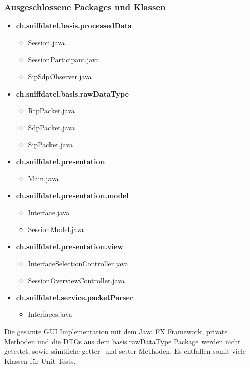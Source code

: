 \documentclass[a4,12pt]{scrartcl}
\begin{document}
\subsubsection{Ausgeschlossene Packages und Klassen}
\begin{itemize}
\item \textbf{ch.sniffdatel.basis.processedData}
\begin{itemize}
\item Session.java
\item SessionParticipant.java
\item SipSdpObserver.java
\end{itemize}
\item \textbf{ch.sniffdatel.basis.rawDataType}
\begin{itemize}
\item RtpPacket.java
\item SdpPacket.java
\item SipPacket.java
\end{itemize}
\item \textbf{ch.sniffdatel.presentation}
\begin{itemize}
\item Main.java
\end{itemize}
\item \textbf{ch.sniffdatel.presentation.model} 
\begin{itemize}
\item Interface.java
\item SessionModel.java
\end{itemize}
\item \textbf{ch.sniffdatel.presentation.view}
\begin{itemize}
\item InterfaceSelectionController.java
\item SessionOverviewController.java
\end{itemize}
\item \textbf{ch.sniffdatel.service.packetParser}
\begin{itemize}
\item Interfaces.java
\end{itemize}
\end{itemize}
Die gesamte GUI Implementation mit dem Java FX Framework, private Methoden und die DTOs aus dem basis.rawDataType Package werden nicht getestet, sowie sämtliche getter- und setter Methoden. Es entfallen somit viele Klassen für Unit Tests. 
\newpage
\end{document}
